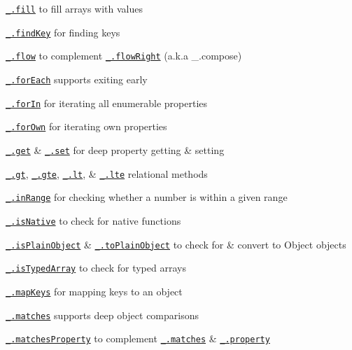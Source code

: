 \begin{DoxyItemize}
\item \href{https://lodash.com/docs#fill}{\tt \+\_\+.\+fill} to fill arrays with values
\item \href{https://lodash.com/docs#findKey}{\tt \+\_\+.\+find\+Key} for finding keys
\item \href{https://lodash.com/docs#flow}{\tt \+\_\+.\+flow} to complement \href{https://lodash.com/docs#flowRight}{\tt \+\_\+.\+flow\+Right} (a.\+k.\+a {\ttfamily \+\_\+.\+compose})
\item \href{https://lodash.com/docs#forEach}{\tt \+\_\+.\+for\+Each} supports exiting early
\item \href{https://lodash.com/docs#forIn}{\tt \+\_\+.\+for\+In} for iterating all enumerable properties
\item \href{https://lodash.com/docs#forOwn}{\tt \+\_\+.\+for\+Own} for iterating own properties
\item \href{https://lodash.com/docs#get}{\tt \+\_\+.\+get} \& \href{https://lodash.com/docs#set}{\tt \+\_\+.\+set} for deep property getting \& setting
\item \href{https://lodash.com/docs#gt}{\tt \+\_\+.\+gt}, \href{https://lodash.com/docs#gte}{\tt \+\_\+.\+gte}, \href{https://lodash.com/docs#lt}{\tt \+\_\+.\+lt}, \& \href{https://lodash.com/docs#lte}{\tt \+\_\+.\+lte} relational methods
\item \href{https://lodash.com/docs#inRange}{\tt \+\_\+.\+in\+Range} for checking whether a number is within a given range
\item \href{https://lodash.com/docs#isNative}{\tt \+\_\+.\+is\+Native} to check for native functions
\item \href{https://lodash.com/docs#isPlainObject}{\tt \+\_\+.\+is\+Plain\+Object} \& \href{https://lodash.com/docs#toPlainObject}{\tt \+\_\+.\+to\+Plain\+Object} to check for \& convert to {\ttfamily Object} objects
\item \href{https://lodash.com/docs#isTypedArray}{\tt \+\_\+.\+is\+Typed\+Array} to check for typed arrays
\item \href{https://lodash.com/docs#mapKeys}{\tt \+\_\+.\+map\+Keys} for mapping keys to an object
\item \href{https://lodash.com/docs#matches}{\tt \+\_\+.\+matches} supports deep object comparisons
\item \href{https://lodash.com/docs#matchesProperty}{\tt \+\_\+.\+matches\+Property} to complement \href{https://lodash.com/docs#matches}{\tt \+\_\+.\+matches} \& \href{https://lodash.com/docs#property}{\tt \+\_\+.\+property}

\end{DoxyItemize}
